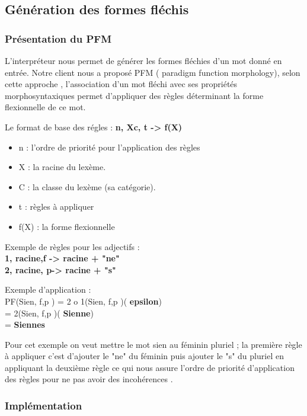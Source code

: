 \documentclass[12pt,a4paper]{article}
\begin{document}
\subsection{Génération des formes fléchis  }
\subsubsection{Présentation du PFM }
L'interpréteur  nous permet de générer les formes fléchies d'un mot donné en entrée. 
Notre client nous a proposé PFM ( paradigm function morphology), selon cette approche , l'association d'un mot fléchi avec ses propriétés morphosyntaxiques permet d'appliquer des règles déterminant la forme flexionnelle de ce mot.


      Le format de base des régles : \textbf{n, Xc, t -> f(X) } \\
\begin{itemize}
    \item n : l’ordre de priorité pour l’application des règles
    \item X : la racine du lexème.
    \item C : la classe du lexème (sa catégorie).
    \item t : règles à appliquer
    \item f(X) : la forme flexionnelle
\end{itemize}

Exemple de règles pour les adjectifs : \\
\textbf{1, racine,{f} -> racine + "ne"} \\
\textbf{2, racine, {p}-> racine + "s"}

Exemple d'application : \\
PF(Sien, {f,p} ) = 2 o 1(Sien, {f,p} )(\textbf{ epsilon}) \\
                 = 2(Sien, {f,p} )(\textbf{ Sienne}) \\
                 =\textbf{ Siennes }

Pour cet exemple on veut mettre le mot sien au féminin pluriel ; la première règle à appliquer c'est d'ajouter le "ne" du féminin puis ajouter le "s" du pluriel en appliquant la deuxième règle ce qui nous assure l'ordre de priorité d'application des règles pour ne pas avoir des incohérences .
\subsubsection{Implémentation}
\end{document}
